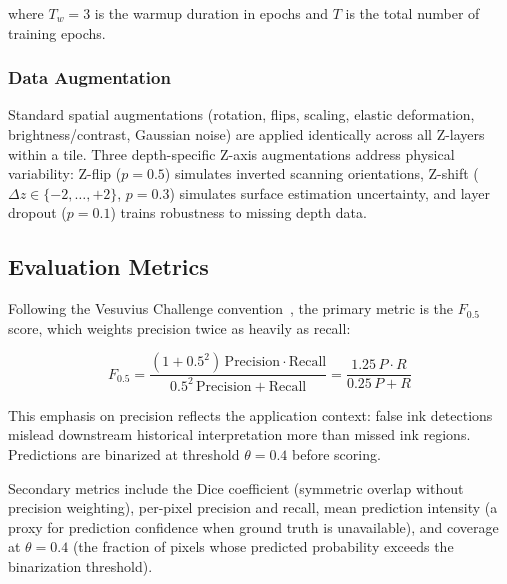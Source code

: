 \noindent where $T_w = 3$ is the warmup duration in epochs and $T$ is the total number of training epochs.

\subsubsection{Data Augmentation}

Standard spatial augmentations (rotation, flips, scaling, elastic deformation, brightness/contrast, Gaussian noise) are applied identically across all Z-layers within a tile. Three depth-specific Z-axis augmentations address physical variability: Z-flip ($p = 0.5$) simulates inverted scanning orientations, Z-shift ($\Delta z \in \{-2,\ldots,+2\}$, $p = 0.3$) simulates surface estimation uncertainty, and layer dropout ($p = 0.1$) trains robustness to missing depth data.

\subsection{Evaluation Metrics}
\label{sec:metrics}

Following the Vesuvius Challenge convention~\cite{vesuvius2023challenge}, the primary metric is the $F_{0.5}$ score, which weights precision twice as heavily as recall:

\begin{equation}
\label{eq:f05}
F_{0.5} = \frac{(1 + 0.5^2)\,\text{Precision} \cdot \text{Recall}}{0.5^2\,\text{Precision} + \text{Recall}} = \frac{1.25\,P \cdot R}{0.25\,P + R}
\end{equation}

\noindent This emphasis on precision reflects the application context: false ink detections mislead downstream historical interpretation more than missed ink regions. Predictions are binarized at threshold $\theta = 0.4$ before scoring.

Secondary metrics include the Dice coefficient (symmetric overlap without precision weighting), per-pixel precision and recall, mean prediction intensity (a proxy for prediction confidence when ground truth is unavailable), and coverage at $\theta = 0.4$ (the fraction of pixels whose predicted probability exceeds the binarization threshold).
